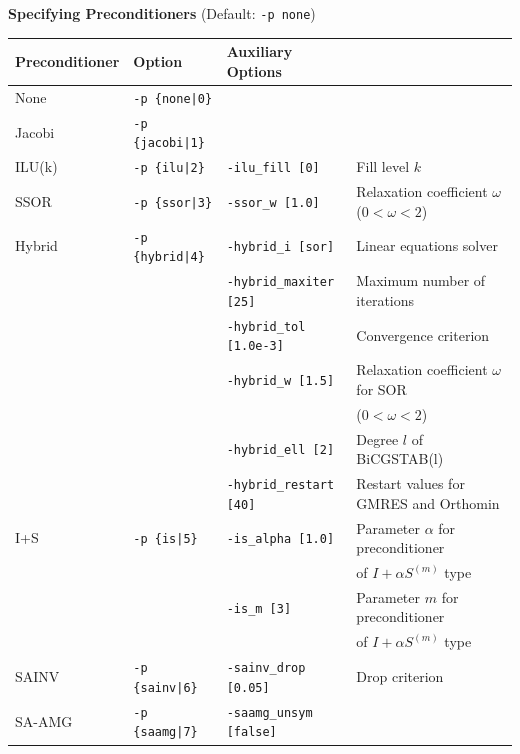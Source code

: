 \documentclass[a4paper]{article}
\begin{document}
\\ \\
\begin{minipage}[t]{\textwidth}
\begin{center}
{\bf Specifying Preconditioners} (Default: \verb=-p none=)\\
\begin{tabular}{l|lll}\hline\hline
Preconditioner   & Option           & Auxiliary Options \\ \hline
None     & \verb=-p {none|0}=    &   \\
Jacobi   & \verb=-p {jacobi|1}=  &     \\
ILU(k)   & \verb=-p {ilu|2}=     & \verb=-ilu_fill [0]=    & Fill level $k$ \\
SSOR     & \verb=-p {ssor|3}=    & \verb=-ssor_w [1.0]=    & Relaxation coefficient $\omega$ ($0<\omega<2$) \\
Hybrid   & \verb=-p {hybrid|4}=  & \verb=-hybrid_i [sor]=  & Linear
 equations solver \\
         &                       & \verb=-hybrid_maxiter [25]= & Maximum number of iterations \\
         &                       & \verb=-hybrid_tol [1.0e-3]= & Convergence criterion \\
         &                       & \verb=-hybrid_w [1.5]=      & Relaxation coefficient $\omega$ for SOR\\
         &                       &                             &  ($0<\omega<2$) \\
         &                       & \verb=-hybrid_ell [2]=      & Degree $l$ of BiCGSTAB(l) \\
         &                       & \verb=-hybrid_restart [40]= & Restart values for GMRES and Orthomin \\
I+S      & \verb=-p {is|5}=      & \verb=-is_alpha [1.0]=  &  Parameter $\alpha$ for preconditioner \\
         &                       &                         &   of $I+\alpha S^{(m)}$ type \\
         &                       & \verb=-is_m [3]=        & Parameter $m$ for preconditioner \\
         &                       &                         &  of $I+\alpha S^{(m)}$ type \\
SAINV    & \verb=-p {sainv|6}=   & \verb=-sainv_drop [0.05]=    & Drop criterion\\
SA-AMG   & \verb=-p {saamg|7}=   & \verb=-saamg_unsym [false]=    &

\end{tabular}
\end{center}
\end{minipage}
\end{document}
